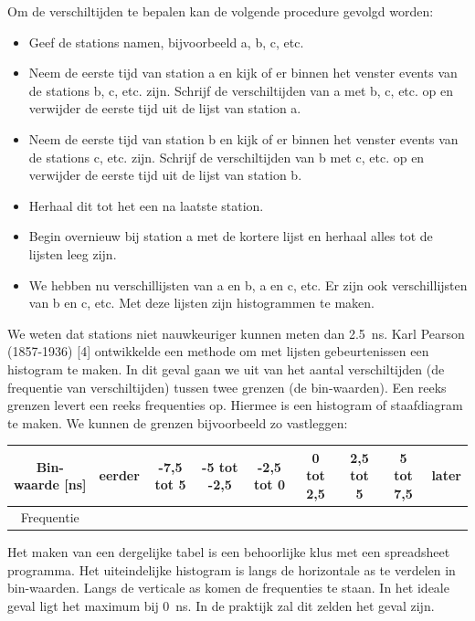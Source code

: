 Om de verschiltijden te bepalen kan de volgende procedure gevolgd
worden:
\begin{itemize}
\item Geef de stations namen, bijvoorbeeld a, b, c, etc.
\item Neem de eerste tijd van station a en kijk of er binnen het venster
events van de stations b, c, etc. zijn. Schrijf de verschiltijden
van a met b, c, etc. op en verwijder de eerste tijd uit de lijst van
station a.
\item Neem de eerste tijd van station b en kijk of er binnen het venster
events van de stations c, etc. zijn. Schrijf de verschiltijden van
b met c, etc. op en verwijder de eerste tijd uit de lijst van station
b.
\item Herhaal dit tot het een na laatste station.
\item Begin overnieuw bij station a met de kortere lijst en herhaal alles
tot de lijsten leeg zijn.
\item We hebben nu verschillijsten van a en b, a en c, etc. Er zijn ook
verschillijsten van b en c, etc. Met deze lijsten zijn histogrammen
te maken. 
\end{itemize}
We weten dat stations niet nauwkeuriger kunnen meten dan \SI{2,5}{\nano\second}.
Karl Pearson (1857-1936) {[}4{]} ontwikkelde een methode om met lijsten
gebeurtenissen een histogram te maken. In dit geval gaan we uit van
het aantal verschiltijden (de frequentie van verschiltijden) tussen
twee grenzen (de bin-waarden). Een reeks grenzen levert een reeks
frequenties op. Hiermee is een histogram of staafdiagram te maken.
We kunnen de grenzen bijvoorbeeld zo vastleggen:

\bigskip{}
\begin{tabular}{|c|c|c|c|c|c|c|c|c|}
\hline 
Bin-waarde {[}ns{]} & eerder & -7,5 tot 5 & -5 tot -2,5 & -2,5 tot 0 & 0 tot 2,5 & 2,5 tot 5 & 5 tot 7,5 & later\tabularnewline
\hline 
Frequentie &  &  &  &  &  &  &  & \tabularnewline
\hline 
\end{tabular}

\bigskip{}


Het maken van een dergelijke tabel is een behoorlijke klus met een
spreadsheet programma. Het uiteindelijke histogram is langs de horizontale
as te verdelen in bin-waarden. Langs de verticale as komen de frequenties
te staan. In het ideale geval ligt het maximum bij \SI{0}{\nano\second}.
In de praktijk zal dit zelden het geval zijn.

\bigskip{}


